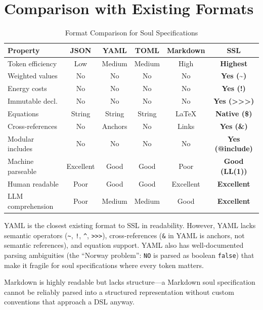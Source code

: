 \documentclass[12pt,a4paper]{article}
\theoremstyle{plain}
\theoremstyle{definition}
\theoremstyle{remark}
\begin{document}
\section{Comparison with Existing Formats}

\begin{table}[H]
\centering
\caption{Format Comparison for Soul Specifications}
\label{tab:formats}
\begin{tabular}{@{}lccccc@{}}
\toprule
\textbf{Property} & \textbf{JSON} & \textbf{YAML} & \textbf{TOML} & \textbf{Markdown} & \textbf{SSL} \\
\midrule
Token efficiency & Low & Medium & Medium & High & \textbf{Highest} \\
Weighted values & No & No & No & No & \textbf{Yes (\~{})} \\
Energy costs & No & No & No & No & \textbf{Yes (!)} \\
Immutable decl. & No & No & No & No & \textbf{Yes (>>>)} \\
Equations & String & String & String & LaTeX & \textbf{Native (\$)} \\
Cross-references & No & Anchors & No & Links & \textbf{Yes (\&)} \\
Modular includes & No & No & No & No & \textbf{Yes (@include)} \\
Machine parseable & Excellent & Good & Good & Poor & \textbf{Good (LL(1))} \\
Human readable & Poor & Good & Good & Excellent & \textbf{Excellent} \\
LLM comprehension & Poor & Medium & Medium & Good & \textbf{Excellent} \\
\bottomrule
\end{tabular}
\end{table}

YAML is the closest existing format to SSL in readability. However, YAML lacks semantic operators (\texttt{\~{}}, \texttt{!}, \texttt{\^{}}, \texttt{>>>}), cross-references (\texttt{\&} in YAML is anchors, not semantic references), and equation support. YAML also has well-documented parsing ambiguities (the ``Norway problem'': \texttt{NO} is parsed as boolean \texttt{false}) that make it fragile for soul specifications where every token matters.

Markdown is highly readable but lacks structure---a Markdown soul specification cannot be reliably parsed into a structured representation without custom conventions that approach a DSL anyway.
\end{document}
